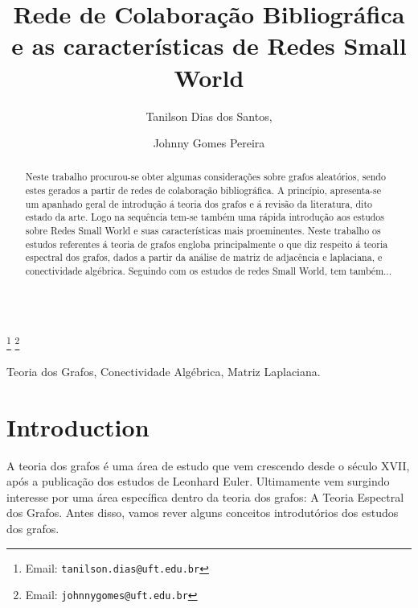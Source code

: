 \documentclass{endm}
\begin{document}
\begin{verbatim}\end{verbatim}\vspace{2.5cm}

\begin{frontmatter}

\title{Rede de Colaboração Bibliográfica e as características de Redes Small World}


\author{Tanilson Dias dos Santos,}
\author{Johnny Gomes Pereira}
\address{Universidade Federal do Tocantins, Tocantins, Brasil}


\thanks[tanilson]{Email:
   {\texttt{\normalshape tanilson.dias@uft.edu.br}}}
\thanks[johnny]{Email:
   {\texttt{\normalshape johnnygomes@uft.edu.br}}}

\begin{abstract}
Neste trabalho procurou-se obter algumas considerações sobre grafos aleatórios, sendo estes gerados a partir de redes de colaboração bibliográfica. A princípio, apresenta-se um apanhado geral de introdução á teoria dos grafos e á revisão da literatura, dito estado da arte. Logo na sequência tem-se também uma rápida introdução aos estudos sobre Redes Small World e suas características mais proeminentes. Neste trabalho os estudos referentes á teoria de grafos engloba principalmente o que diz respeito á teoria espectral dos grafos, dados a partir da análise de matriz de adjacência e laplaciana, e conectividade algébrica. Seguindo com os estudos de redes Small World, tem também...
\end{abstract}

\begin{keyword}
Teoria dos Grafos, Conectividade Algébrica, Matriz Laplaciana.
\end{keyword}

\end{frontmatter}



\section{Introduction}\label{intro}
A teoria dos grafos é uma área de estudo que vem crescendo desde o século XVII, após a publicação dos estudos de Leonhard Euler\cite{audemir01:MSc}. Ultimamente vem surgindo interesse por uma área específica dentro da teoria dos grafos: A Teoria Espectral dos Grafos. Antes disso, vamos rever alguns conceitos introdutórios dos estudos dos grafos.
\end{document}
